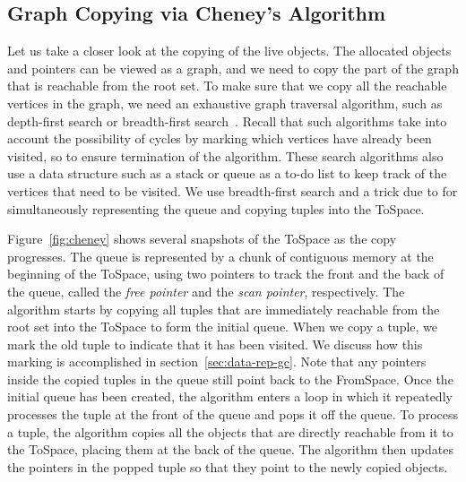 \documentclass[7x10]{TimesAPriori_MIT}%
\numberwithin{theorem}{chapter}
\numberwithin{definition}{chapter}
\numberwithin{equation}{chapter}
\begin{document}
\subsection{Graph Copying via Cheney's Algorithm}
\label{sec:cheney}

Let us take a closer look at the copying of the live objects. The
allocated objects and pointers can be viewed
as a graph, and we need to copy the part of the graph that is
reachable from the root set. To make sure that we copy all the
reachable vertices in the graph, we need an exhaustive graph traversal
algorithm, such as depth-first search or breadth-first
search~\citep{Moore:1959aa,Cormen:2001uq}. Recall that such algorithms
take into account the possibility of cycles by marking which vertices
have already been visited, so to ensure termination of the
algorithm. These search algorithms also use a data structure such as a
stack or queue as a to-do list to keep track of the vertices that need
to be visited. We use breadth-first search and a trick due to
\citet{Cheney:1970aa} for simultaneously representing the queue and
copying tuples into the ToSpace.

Figure~\ref{fig:cheney} shows several snapshots of the ToSpace as the
copy progresses. The queue is represented by a chunk of contiguous
memory at the beginning of the ToSpace, using two pointers to track
the front and the back of the queue, called the \emph{free pointer}
and the \emph{scan pointer}, respectively. The algorithm starts by
copying all tuples that are immediately reachable from the root set
into the ToSpace to form the initial queue.  When we copy a tuple, we
mark the old tuple to indicate that it has been visited. We discuss
how this marking is accomplished in section~\ref{sec:data-rep-gc}. Note
that any pointers inside the copied tuples in the queue still point
back to the FromSpace. Once the initial queue has been created, the
algorithm enters a loop in which it repeatedly processes the tuple at
the front of the queue and pops it off the queue.  To process a tuple,
the algorithm copies all the objects that are directly reachable from it
to the ToSpace, placing them at the back of the queue. The algorithm
then updates the pointers in the popped tuple so that they point to the
newly copied objects.
\end{document}
